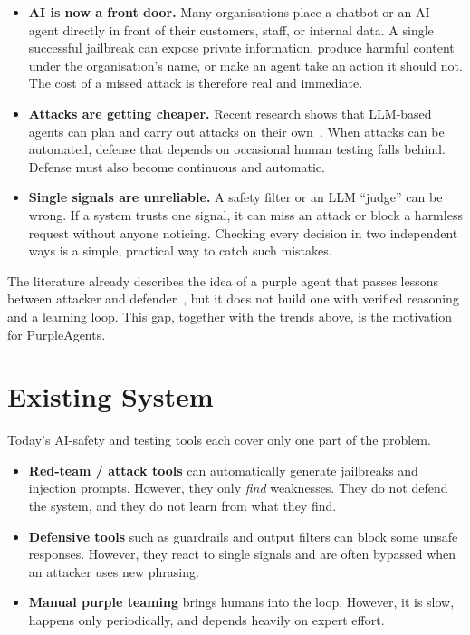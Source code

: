 \begin{itemize}
  \item \textbf{AI is now a front door.} Many organisations place a chatbot or an
  AI agent directly in front of their customers, staff, or internal data. A single
  successful jailbreak can expose private information, produce harmful content
  under the organisation's name, or make an agent take an action it should not.
  The cost of a missed attack is therefore real and immediate.

  \item \textbf{Attacks are getting cheaper.} Recent research shows that LLM-based
  agents can plan and carry out attacks on their own~\cite{fang2024hack,
  xu2025forewarned}. When attacks can be automated, defense that depends on
  occasional human testing falls behind. Defense must also become continuous and
  automatic.

  \item \textbf{Single signals are unreliable.} A safety filter or an LLM ``judge''
  can be wrong. If a system trusts one signal, it can miss an attack or block a
  harmless request without anyone noticing. Checking every decision in two
  independent ways is a simple, practical way to catch such mistakes.
\end{itemize}

The literature already describes the idea of a purple agent that passes lessons
between attacker and defender~\cite{li2025shields}, but it does not build one with
verified reasoning and a learning loop. This gap, together with the trends above,
is the motivation for PurpleAgents.

\section{Existing System}

Today's AI-safety and testing tools each cover only one part of the problem.

\begin{itemize}
  \item \textbf{Red-team / attack tools} can automatically generate jailbreaks and
  injection prompts. However, they only \emph{find} weaknesses. They do not defend
  the system, and they do not learn from what they find.
  \item \textbf{Defensive tools} such as guardrails and output filters can block
  some unsafe responses. However, they react to single signals and are often
  bypassed when an attacker uses new phrasing.
  \item \textbf{Manual purple teaming} brings humans into the loop. However, it is
  slow, happens only periodically, and depends heavily on expert effort.
\end{itemize}

